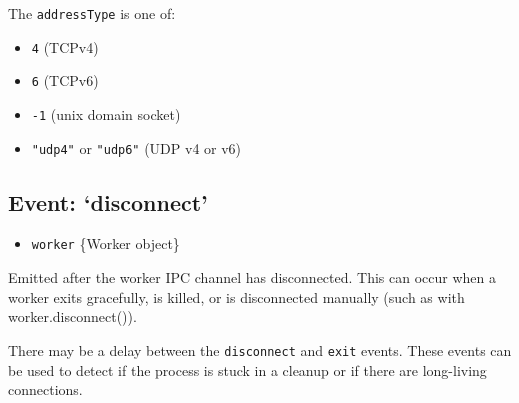 \begin{Shaded}
\begin{Highlighting}[]
\NormalTok{(}\NormalTok{, }
  \NormalTok{(} \NormalTok{+ } \NormalTok{+ } \NormalTok{+ }\NormalTok{);}
\NormalTok{\});}
\end{Highlighting}
\end{Shaded}

The \texttt{addressType} is one of:

\begin{itemize}
\itemsep1pt\parskip0pt
\item
  \texttt{4} (TCPv4)
\item
  \texttt{6} (TCPv6)
\item
  \texttt{-1} (unix domain socket)
\item
  \texttt{"udp4"} or \texttt{"udp6"} (UDP v4 or v6)
\end{itemize}

\subsection{\texorpdfstring{Event:
`disconnect'}{Event: disconnect}}\label{event-disconnect}

\begin{itemize}
\itemsep1pt\parskip0pt
\item
  \texttt{worker} \{Worker object\}
\end{itemize}

Emitted after the worker IPC channel has disconnected. This can occur
when a worker exits gracefully, is killed, or is disconnected manually
(such as with worker.disconnect()).

There may be a delay between the \texttt{disconnect} and \texttt{exit}
events. These events can be used to detect if the process is stuck in a
cleanup or if there are long-living connections.

\begin{Shaded}
\begin{Highlighting}[]
\NormalTok{(}\NormalTok{, }
  \NormalTok{(} \NormalTok{+ } \NormalTok{+ }\NormalTok{);}
\NormalTok{\});}
\end{Highlighting}
\end{Shaded}

